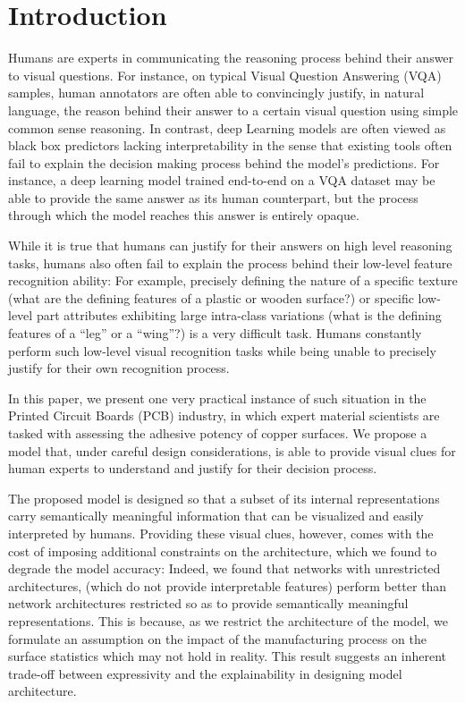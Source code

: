 \documentclass[10pt,twocolumn,letterpaper]{article}
\begin{document}
\section{Introduction}

Humans are experts in communicating the reasoning process behind their answer to visual questions.
For instance, on typical Visual Question Answering (VQA) samples, 
human annotators are often able to convincingly justify, in natural language, the reason 
behind their answer to a certain visual question using simple common sense reasoning.
In contrast, deep Learning models are often viewed as black box predictors lacking interpretability 
in the sense that existing tools often fail to explain the decision making process behind the model’s predictions.
For instance, a deep learning model trained end-to-end on a VQA dataset may be able to provide the same answer as its
human counterpart, but the process through which the model reaches this answer is entirely opaque.

While it is true that humans can justify for their answers on high level reasoning tasks, 
humans also often fail to explain the process behind their low-level feature recognition ability:
For example, precisely defining the nature of a specific texture 
(what are the defining features of a plastic or wooden surface?) 
or specific low-level part attributes exhibiting large intra-class variations 
(what is the defining features of a ``leg'' or a ``wing''?) is a very difficult task.
Humans constantly perform such low-level visual recognition tasks 
while being unable to precisely justify for their own recognition process.
	
In this paper, we present one very practical instance of such situation in the Printed Circuit Boards (PCB) industry, 
in which expert material scientists are tasked with assessing the adhesive potency of copper surfaces.
We propose a model that, under careful design considerations, is able to provide visual clues 
for human experts to understand and justify for their decision process.
	
The proposed model is designed so that a subset of its internal representations carry semantically meaningful 
information that can be visualized and easily interpreted by humans.
Providing these visual clues, however, comes with the cost of imposing additional constraints on the architecture,
which we found to degrade the model accuracy:
Indeed, we found that networks with unrestricted architectures, 
(which do not provide interpretable features)
perform better than network architectures restricted so as to provide 
semantically meaningful representations.
This is because, as we restrict the architecture of the model, 
we formulate an assumption on the impact of the manufacturing process 
on the surface statistics which may not hold in reality.
This result suggests an inherent trade-off between  
expressivity and the explainability in designing model architecture.
	
\end{document}
